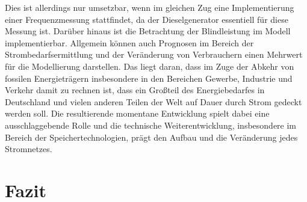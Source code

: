 Dies ist allerdings nur umsetzbar, wenn im gleichen Zug eine Implementierung einer Frequenzmessung stattfindet, da der Dieselgenerator essentiell für diese Messung ist.
Darüber hinaus ist die Betrachtung der Blindleistung im Modell implementierbar.
Allgemein können auch Prognosen im Bereich der Strombedarfsermittlung und der Veränderung von Verbrauchern einen Mehrwert für die Modellierung darstellen.
Das liegt daran, dass im Zuge der Abkehr von fossilen Energieträgern insbesondere in den Bereichen Gewerbe, Industrie und Verkehr damit zu rechnen ist, dass ein Großteil des Energiebedarfes in Deutschland und vielen anderen Teilen der Welt auf Dauer durch Strom gedeckt werden soll.
Die resultierende momentane Entwicklung spielt dabei eine ausschlaggebende Rolle und die technische Weiterentwicklung, insbesondere im Bereich der Speichertechnologien, prägt den Aufbau und die Veränderung jedes Stromnetzes.


\chapter{Fazit}
